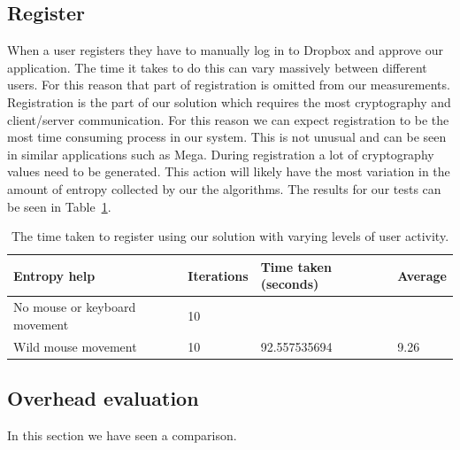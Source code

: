 \documentclass[12pt, titlepage]{article}
\begin{document}
\subsection{Register}
When a user registers they have to manually log in to Dropbox and approve our application. The time it takes to do this can vary massively between different users. For this reason that part of registration is omitted from our measurements. 
\newline \indent Registration is the part of our solution which requires the most cryptography and client/server communication. For this reason we can expect registration to be the most time consuming process in our system. This is not unusual and can be seen in similar applications such as Mega.
\newline \indent During registration a lot of cryptography values need to be generated. This action will likely have the most variation in the amount of entropy collected by our the algorithms.
\newline \indent The results for our tests can be seen in Table~\ref{tab:registerBenchmark}. 


\begin{table}[h]
	\begin{center}
    	\begin{tabular}{ | l | l | l | l |}
    \hline
     \textbf{Entropy help} & \textbf{Iterations} & \textbf{Time taken 		(seconds)} & \textbf{Average} \\ \hline
    No mouse or keyboard movement & 10 &  &  \\ \hline
    Wild mouse movement & 10 & 92.557535694 & 9.26 \\ \hline
    
    \end{tabular}
    \caption{The time taken to register using our solution with varying levels of user activity.}
    \label{tab:registerBenchmark}
   \end{center}
\end{table}

\subsection{Overhead evaluation}
In this section we have seen a comparison.
\end{document}
